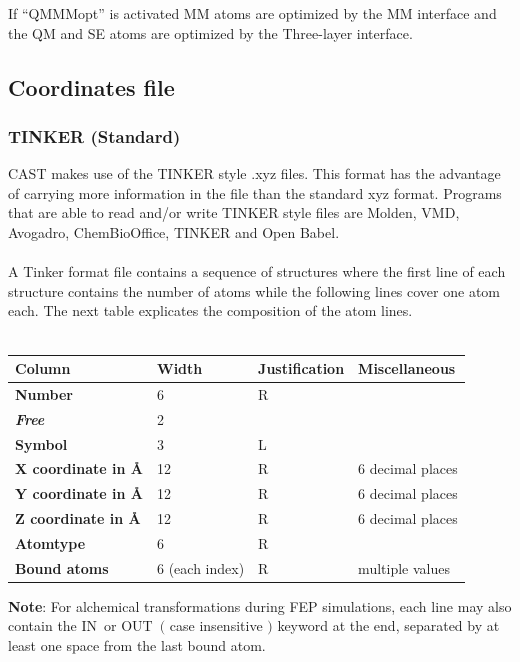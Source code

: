 \documentclass[10pt,a4paper]{article} %
\begin{document}
If ``QMMMopt'' is activated MM atoms are optimized by the MM interface and the QM and SE atoms are optimized by the Three-layer interface.
			
	\subsection{Coordinates file}
	
	\subsubsection{TINKER (Standard)}
	\ac{CAST} makes use of the TINKER\supercite{tinker} style .xyz files. This format has the advantage of carrying more information in the file than the standard xyz format. Programs that are able to read and/or write TINKER style files are Molden\supercite{molden}, \ac{VMD}\supercite{vmd}, Avogadro\supercite{avogadro}, ChemBioOffice\supercite{chembiooffice}, TINKER\supercite{tinker} and Open Babel\supercite{openbabel}. \\~\\
	A Tinker format file contains a sequence of structures where the first line of each structure contains the number of atoms while the following lines cover one atom each. The next table explicates the composition of the atom lines.\\~\\

	\begin{longtable}{|l|l|l|l}
		Column & Width & Justification & Miscellaneous\\
		\hline
		\textbf{Number}	& 6			& R	& ~\\
		\textbf{\textit{Free}}	& 2			&  ~ & ~\\
		\textbf{Symbol}	& 3			& L	& ~\\
		\textbf{X coordinate in \AA}	& 12			& R & 6 decimal places\\
		\textbf{Y coordinate in \AA}	& 12			 & R & 6 decimal places\\
		\textbf{Z coordinate in \AA}	& 12			& R	& 6 decimal places\\
		\textbf{Atomtype}	& 6			& R	& ~\\
		\textbf{Bound atoms}	& 6 (each index)			& R	& multiple values\\
	\end{longtable}
	\textbf{Note}: For alchemical transformations during \acl{FEP} simulations, each line may also contain the \glqq IN\grqq~or \glqq OUT\grqq~$($ case insensitive $)$ keyword at the end, separated by at least one space from the last bound atom.
\end{document}
